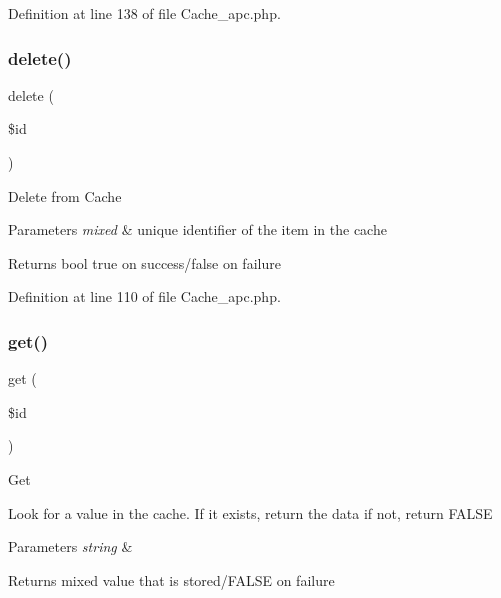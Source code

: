 Definition at line 138 of file Cache\+\_\+apc.\+php.

\mbox{\label{class_c_i___cache__apc_a2f8258add505482d7f00ea26493a5723}} 
\subsubsection{\texorpdfstring{delete()}{delete()}}
{\footnotesize\ttfamily delete (\begin{DoxyParamCaption}\item[{}]{\$id }\end{DoxyParamCaption})}

Delete from Cache


\begin{DoxyParams}{Parameters}
{\em mixed} & unique identifier of the item in the cache \\
\hline
\end{DoxyParams}
\begin{DoxyReturn}{Returns}
bool true on success/false on failure 
\end{DoxyReturn}


Definition at line 110 of file Cache\+\_\+apc.\+php.

\mbox{\label{class_c_i___cache__apc_a50e3bfb586b2f42932a6a93f3fbb0828}} 
\subsubsection{\texorpdfstring{get()}{get()}}
{\footnotesize\ttfamily get (\begin{DoxyParamCaption}\item[{}]{\$id }\end{DoxyParamCaption})}

Get

Look for a value in the cache. If it exists, return the data if not, return F\+A\+L\+SE


\begin{DoxyParams}{Parameters}
{\em string} & \\
\hline
\end{DoxyParams}
\begin{DoxyReturn}{Returns}
mixed value that is stored/\+F\+A\+L\+SE on failure 
\end{DoxyReturn}


